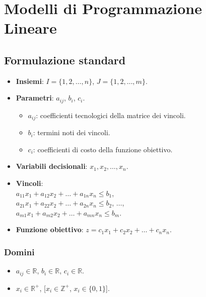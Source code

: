 \section{Modelli di Programmazione Lineare}
\label{sec:modelli_PL}

    \subsection{Formulazione standard}
        \begin{itemize}
            \item \textbf{Insiemi}: $I = \{1, 2, \dots, n\}$, $J = \{1, 2, \dots, m\}$.
            \item \textbf{Parametri}: $a_{ij}$, $b_i$, $c_i$.
                \begin{itemize}
                    \item $a_{ij}$: coefficienti tecnologici della matrice dei vincoli.
                    \item $b_i$: termini noti dei vincoli.
                    \item $c_i$: coefficienti di costo della funzione obiettivo.
                \end{itemize}
            \item \textbf{Variabili decisionali}: $x_1, x_2, \dots, x_n$.
            \item \textbf{Vincoli}: \\ 
            $a_{11}x_1 + a_{12}x_2 + \dots + a_{1n}x_n \leq b_1$, \\ 
            $a_{21}x_1 + a_{22}x_2 + \dots + a_{2n}x_n \leq b_2$, $\dots$, \\ 
            $a_{m1}x_1 + a_{m2}x_2 + \dots + a_{mn}x_n \leq b_m$.
            \item \textbf{Funzione obiettivo}: $z = c_1x_1 + c_2x_2 + \dots + c_nx_n$.
        \end{itemize}

        \subsubsection{Domini}
            \begin{itemize}
                \item $a_{ij} \in \mathbb{R}$, $b_i \in \mathbb{R}$, $c_i \in \mathbb{R}$.
                \item $x_i \in \mathbb{R}^+$, [$x_i \in \mathbb{Z}^+$, $x_i \in \{0, 1\}$].
            \end{itemize}

